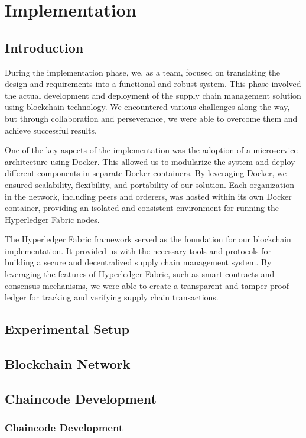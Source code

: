 
\chapter{Implementation}\doublespacing %

\label{Chapter6} %



\section{Introduction}
During the implementation phase, we, as a team, focused on translating the design and requirements into a functional and robust system. This phase involved the actual development and deployment of the supply chain management solution using blockchain technology. We encountered various challenges along the way, but through collaboration and perseverance, we were able to overcome them and achieve successful results.
\par One of the key aspects of the implementation was the adoption of a microservice architecture using Docker. This allowed us to modularize the system and deploy different components in separate Docker containers. By leveraging Docker, we ensured scalability, flexibility, and portability of our solution. Each organization in the network, including peers and orderers, was hosted within its own Docker container, providing an isolated and consistent environment for running the Hyperledger Fabric nodes.
\par The Hyperledger Fabric framework served as the foundation for our blockchain implementation. It provided us with the necessary tools and protocols for building a secure and decentralized supply chain management system. By leveraging the features of Hyperledger Fabric, such as smart contracts and consensus mechanisms, we were able to create a transparent and tamper-proof ledger for tracking and verifying supply chain transactions.




\section{ Experimental Setup}
\lipsum[22-25]

\section{Blockchain Network}
\lipsum[22-25]

\section{Chaincode Development}
\lipsum[22-25]
\subsection{Chaincode Development}
\lipsum[22-25]







